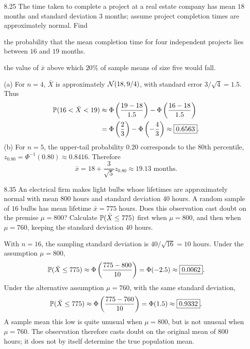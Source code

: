 \documentclass[11pt,oneside]{article}
\begin{document}
\begin{exercise}{8.25}
The time taken to complete a project at a real estate company has mean $18$ months and standard deviation $3$ months; assume project completion times are approximately normal. Find
\begin{exercisesubparts}
\item the probability that the mean completion time for four independent projects lies between $16$ and $19$ months.
\item the value of $\bar x$ above which $20\%$ of sample means of size five would fall.
\end{exercisesubparts}
\end{exercise}
\begin{solution}
\noindent\textup{(a)} For $n=4$, $\bar X$ is approximately $\mathcal{N}(18, 9/4)$, with standard error $3/\sqrt4=1.5$. Thus
\[
\begin{aligned}
\mathbb{P}(16<\bar X<19)
&\approx\Phi\left(\frac{19-18}{1.5}\right)-\Phi\left(\frac{16-18}{1.5}\right)\\
&=\Phi\left(\frac23\right)-\Phi\left(-\frac43\right)
\approx\boxed{0.6563}.
\end{aligned}
\]
\noindent\textup{(b)} For $n=5$, the upper-tail probability $0.20$ corresponds to the 80th percentile, $z_{0.80}=\Phi^{-1}(0.80)\approx0.8416$. Therefore
\[
\boxed{\bar x=18+\frac3{\sqrt5}z_{0.80}\approx19.13\text{ months}}.
\]
\end{solution}

\begin{exercise}{8.35}
An electrical firm makes light bulbs whose lifetimes are approximately normal with mean $800$ hours and standard deviation $40$ hours. A random sample of $16$ bulbs has mean lifetime $\bar x=775$ hours. Does this observation cast doubt on the premise $\mu=800$? Calculate $\mathbb{P}(\bar X\le775)$ first when $\mu=800$, and then when $\mu=760$, keeping the standard deviation $40$ hours.
\end{exercise}
\begin{solution}
With $n=16$, the sampling standard deviation is $40/\sqrt{16}=10$ hours. Under the assumption $\mu=800$,
\[
\mathbb{P}(\bar X\le775)\approx\Phi\left(\frac{775-800}{10}\right)
=\Phi(-2.5)\approx\boxed{0.0062}.
\]
Under the alternative assumption $\mu=760$, with the same standard deviation,
\[
\mathbb{P}(\bar X\le775)\approx\Phi\left(\frac{775-760}{10}\right)
=\Phi(1.5)\approx\boxed{0.9332}.
\]
A sample mean this low is quite unusual when $\mu=800$, but is not unusual when $\mu=760$. The observation therefore casts doubt on the original mean of $800$ hours; it does not by itself determine the true population mean.
\end{solution}
\end{document}
